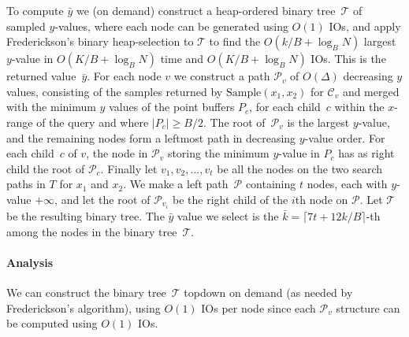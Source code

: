 \documentclass[11pt]{article}
\begin{document}
To compute $\bar{y}$ we (on demand) construct a heap-ordered binary
tree~$\mathcal{T}$ of sampled $y$-values, where each node can be
generated using $O(1)$ IOs, and apply Frederickson's binary
heap-selection to $\mathcal{T}$ to find the $O(k/B+\log_B N)$ largest
$y$-value in $O(K/B+\log_B N)$ time and $O(K/B+\log_B N)$ IOs. This is
the returned value~$\bar{y}$.
%
For each node $v$ we construct a path $\mathcal{P}_v$ of $O(\Delta)$
decreasing $y$ values, consisting of the samples returned by
$\mathrm{Sample}(x_1,x_2)$ for $\mathcal{C}_v$ and merged with the
minimum $y$ values of the point buffers $P_c$, for each child~$c$
within the $x$-range of the query and where $|P_c|\geq B/2$. The root
of~$\mathcal{P}_v$ is the largest $y$-value, and the remaining nodes
form a leftmost path in decreasing $y$-value order. For each child~$c$
of $v$, the node in $\mathcal{P}_v$ storing the minimum $y$-value in
$P_c$ has as right child the root of $\mathcal{P}_c$. Finally let
$v_1,v_2,\ldots,v_t$ be all the nodes on the two search paths in $T$
for $x_1$ and $x_2$. We make a left path~$\mathcal{P}$ containing $t$
nodes, each with $y$-value $+\infty$, and let the root of
$\mathcal{P}_{v_i}$ be the right child of the $i$th node on
$\mathcal{P}$. Let $\mathcal{T}$ be the resulting binary tree. The
$\bar{y}$ value we select is the $\bar{k}=\lceil 7t+12k/B\rceil$-th
among the nodes in the binary tree~$\mathcal{T}$.

\paragraph*{Analysis}

We can construct the binary tree~$\mathcal{T}$ topdown on demand (as
needed by Frederickson's algorithm), using $O(1)$ IOs per node since
each $\mathcal{P}_v$ structure can be computed using $O(1)$ IOs.
\end{document}
